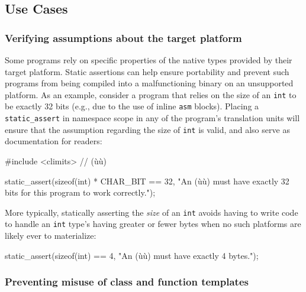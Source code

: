 \subsection[Use Cases]{Use Cases}\label{use-cases}

\subsubsection[Verifying assumptions about the target platform]{Verifying assumptions about the target platform}\label{verifying-assumptions-about-the-target-platform}

Some programs rely on specific properties of the native types provided
by their target platform. Static assertions can help ensure portability
and prevent such programs from being compiled into a malfunctioning
binary on an unsupported platform. As an example, consider a
program that relies on the size of an \lstinline!int! to be exactly 32
bits (e.g., due to the use of inline \lstinline!asm! blocks). Placing a
\lstinline!static_assert! in namespace scope in any of the program's
translation units will ensure that the assumption regarding the size
of \lstinline!int! is valid, and also serve as documentation for readers:

\begin{emcppslisting}
#include <climits>  // (ù{}ù)

static_assert(sizeof(int) * CHAR_BIT == 32,
    "An (ù{}ù) must have exactly 32 bits for this program to work correctly.");
\end{emcppslisting}

\noindent More typically, statically asserting the \emph{size} of an \lstinline!int!
avoids having to write code to handle an \lstinline!int! type's having
greater or fewer bytes when no such platforms are likely ever to
materialize:

\begin{emcppslisting}
static_assert(sizeof(int) == 4, "An (ù{}ù) must have exactly 4 bytes.");
\end{emcppslisting}


\subsubsection[Preventing misuse of class and function templates]{Preventing misuse of class and function templates}\label{preventing-misuse-of-class-and-function-templates}

